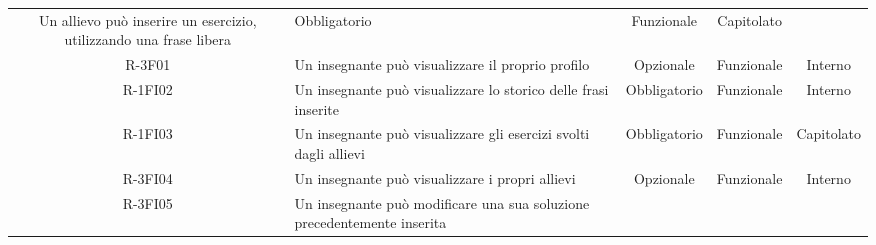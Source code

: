 \begin{tabularx}{\textwidth}{cXccc}

Un allievo può inserire un esercizio, utilizzando una frase libera &

Obbligatorio &

Funzionale &

Capitolato \\
R-3F01 &

Un insegnante può visualizzare il proprio profilo &

Opzionale &

Funzionale &

Interno \\
R-1FI02 &

Un insegnante può visualizzare lo storico delle frasi inserite &

Obbligatorio &

Funzionale &

Interno \\
R-1FI03 &

Un insegnante può visualizzare gli esercizi svolti dagli allievi &

Obbligatorio &

Funzionale &

Capitolato \\
R-3FI04 &

Un insegnante può visualizzare i propri allievi &

Opzionale &

Funzionale &

Interno \\
R-3FI05 &

Un insegnante può modificare una sua soluzione precedentemente inserita &


\end{tabularx}

